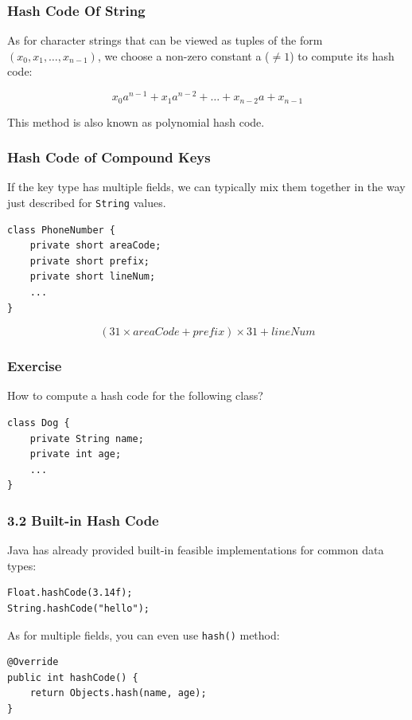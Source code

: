 \documentclass[aspectratio=169, 14pt]{beamer}
\begin{document}
\begin{frame}
    \frametitle{Hash Code Of String}
As for character strings that can be viewed as tuples of the form $(x_0, x_1, \dots, x_{n-1})$, we choose a non-zero constant a ($\neq 1$) to compute its hash code:
    
\[x_0a^{n-1} + x_1a^{n-2} + \dots + x_{n-2}a + x_{n-1} \]

This method is also known as \alert{polynomial hash code}.
\end{frame}

\begin{frame}[fragile]
    \frametitle{Hash Code of Compound Keys}
If the key type has multiple fields, we can typically mix them together in the way just described for \texttt{String} values.

\begin{verbatim}
class PhoneNumber {
    private short areaCode;
    private short prefix;
    private short lineNum;
    ...
}    
\end{verbatim}
\[(31 \times areaCode + prefix) \times 31 + lineNum \]
\end{frame}

\begin{frame}[fragile]
    \frametitle{Exercise}
How to compute a hash code for the following class?
    
\begin{verbatim}
class Dog {
    private String name;
    private int age;
    ...
}    
\end{verbatim}

\end{frame}

\begin{frame}[fragile]
    \frametitle{3.2 Built-in Hash Code}
Java has already provided built-in feasible implementations for common data types:

\begin{verbatim}
Float.hashCode(3.14f);
String.hashCode("hello");
\end{verbatim}
As for multiple fields, you can even use \texttt{hash()} method:
\begin{verbatim}
@Override
public int hashCode() {
    return Objects.hash(name, age);
}
\end{verbatim}

\end{frame}
\end{document}
